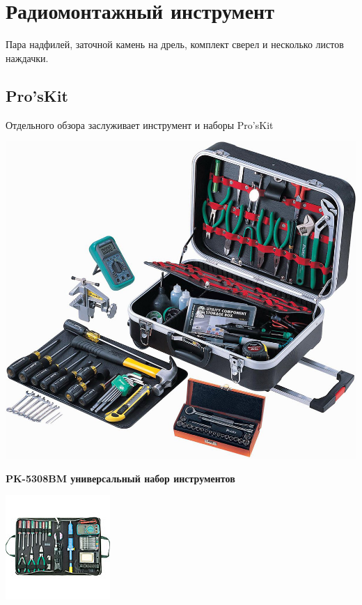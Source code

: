 \section{Радиомонтажный инструмент}

Пара надфилей, заточной камень на дрель, комплект сверел и несколько листов
наждачки.

\subsection{Pro'sKit}
Отдельного обзора заслуживает инструмент и наборы Pro'sKit

\clearpage
\noindent\includegraphics[height=0.95\textheight]{tech/tools/proskit/PK5308BM.jpg}

\textbf{PK-5308BM универсальный набор инструментов}

\clearpage
\noindent\includegraphics[height=0.95\textheight]{tech/tools/proskit/1PK-616B.jpg}

